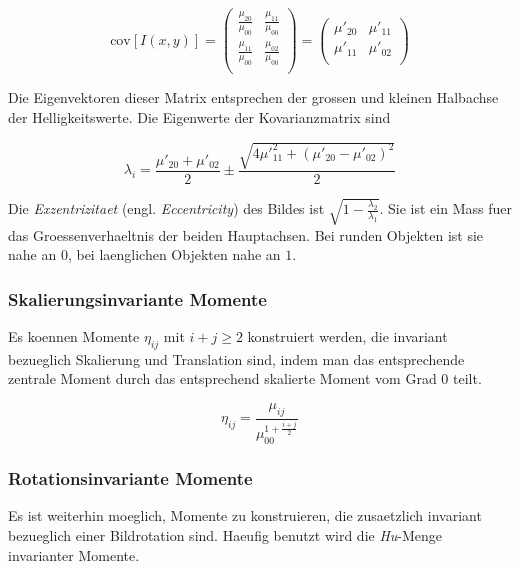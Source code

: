 \begin{equation}
  \text{cov}[I(x,y)] = \begin{pmatrix}
    \frac{\mu_{20}}{\mu_{00}} & \frac{\mu_{11}}{\mu_{00}}\\
    \frac{\mu_{11}}{\mu_{00}} & \frac{\mu_{02}}{\mu_{00}}\\
  \end{pmatrix} = \begin{pmatrix}
    \mu'_{20} & \mu'_{11}\\
    \mu'_{11} & \mu'_{02}\\
  \end{pmatrix}
\end{equation}

Die Eigenvektoren dieser Matrix entsprechen der grossen und kleinen Halbachse der Helligkeitswerte.
Die Eigenwerte der Kovarianzmatrix sind

\begin{equation}
  \lambda_i = \frac{\mu'_{20} + \mu'_{02}}{2} \pm \frac{\sqrt{4 \mu'^2_{11} + (\mu'_{20} - \mu'_{02})^2}}{2}
\end{equation}

Die \emph{Exzentrizitaet} (engl. \emph{Eccentricity}) des Bildes ist $\sqrt{1 - \frac{\lambda_2}{\lambda_1}}$.
Sie ist ein Mass fuer das Groessenverhaeltnis der beiden Hauptachsen.
Bei runden Objekten ist sie nahe an $0$, bei laenglichen Objekten nahe an $1$.

\subsubsection{Skalierungsinvariante Momente}

Es koennen Momente $\eta_{ij}$ mit $i + j \geq 2$ konstruiert werden, die invariant bezueglich Skalierung und Translation sind, indem man das entsprechende zentrale Moment durch das entsprechend skalierte Moment vom Grad $0$ teilt.

\begin{equation}
  \eta_{ij} = \frac{\mu_{ij}}{\mu_{00}^{1 + \frac{i + j}{2}}}
\end{equation}

\subsubsection{Rotationsinvariante Momente}

Es ist weiterhin moeglich, Momente zu konstruieren, die zusaetzlich invariant bezueglich einer Bildrotation sind.
Haeufig benutzt wird die \emph{Hu}-Menge invarianter Momente.

